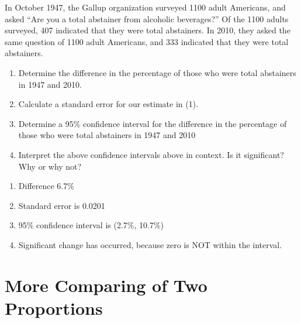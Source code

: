 \documentclass[11pt, chapterprefix=true]{scrbook}\usepackage[]{graphicx}\usepackage[]{color}
\begin{document}
\begin{exercises}
\begin{exercise}
In October 1947, the Gallup organization surveyed 1100 adult Americans, and asked ``Are you a total abstainer from alcoholic beverages?''  Of the 1100 adults surveyed, 407 indicated that they were total abstainers.  In 2010, they asked the same question of 1100 adult Americans, and 333 indicated that they were total abstainers.  
  
\begin{enumerate}
\item Determine the difference in the percentage of those who were total abstainers in 1947 and 2010.

\item Calculate a standard error for our estimate in (1).

\item Determine a 95\% confidence interval for the difference in the percentage of those who were total abstainers in 1947 and 2010

\item Interpret the above confidence intervals above in context.  Is it significant? Why or why not?

\end{enumerate}

\end{exercise}
\begin{solution}

\begin{enumerate}
\item Difference 6.7\% 

\item Standard error is 0.0201
\item  95\% confidence interval is (2.7\%, 10.7\%)

\item Significant change has occurred, because zero is NOT within the interval.

\end{enumerate}

\end{solution}

\end{exercises}

\onecolumn



\chapter{More Comparing of Two Proportions} 

\label{chap:ch10}
\end{document}
